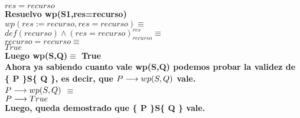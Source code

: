 \documentclass[10pt,a4paper]{article}
\begin{document}
\begin{flushleft}
$res=recurso$\\
\vspace{2mm}
\textbf{Resuelvo wp(S1,res=recurso)}\\
\vspace{2mm}
$wp(res:=recurso,res=recurso)$$\equiv$\\
$def(recurso) \wedge (res=recurso)_{recurso}^{res}$$\equiv$\\
$recurso=recurso$$\equiv$\\
$True$\\
\vspace{2mm}
\textbf{Luego wp(S,Q)$\equiv$ True}\\
\vspace{2mm}
\textbf{Ahora ya sabiendo cuanto vale wp(S,Q) podemos probar la validez de \{ P \}S\{ Q \}, es decir, que $P \longrightarrow wp(S,Q)$ vale.} \\
\vspace{2mm}
$P \longrightarrow wp(S,Q)$ $\equiv$\\
\vspace{2mm}
$P \longrightarrow True$\\
\vspace{2mm}
\textbf{Luego, queda demostrado que \{ P \}S\{ Q \} vale.}


\end{flushleft}
\end{document}
